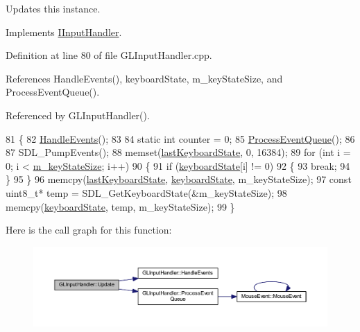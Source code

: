 Updates this instance. 



Implements \hyperlink{class_i_input_handler_af53f50e4542c0e68d7dde659defa960a}{I\+Input\+Handler}.



Definition at line 80 of file G\+L\+Input\+Handler.\+cpp.



References Handle\+Events(), keyboard\+State, m\+\_\+key\+State\+Size, and Process\+Event\+Queue().



Referenced by G\+L\+Input\+Handler().


\begin{DoxyCode}
81 \{
82   \hyperlink{class_g_l_input_handler_a8024ecc15bf5f8a4fa048011eb9e77b1}{HandleEvents}();
83 
84   \textcolor{keyword}{static} \textcolor{keywordtype}{int} counter = 0;
85   \hyperlink{class_g_l_input_handler_a9f03ccbccd3bd3649874f8dfdeeb2271}{ProcessEventQueue}();
86 
87   SDL\_PumpEvents();
88   memset(\hyperlink{class_g_l_input_handler_a578a30a739f18db64d1f6716487165f5}{lastKeyboardState}, 0, 16384);
89   \textcolor{keywordflow}{for} (\textcolor{keywordtype}{int} i = 0; i < \hyperlink{class_g_l_input_handler_afeb05710f1ab21056dd404ba6f41b4b3}{m\_keyStateSize}; i++)
90   \{
91     \textcolor{keywordflow}{if} (\hyperlink{class_g_l_input_handler_a0939fc9cb14210cebfb2b5f57717cef9}{keyboardState}[i] != 0)
92     \{
93       \textcolor{keywordflow}{break};
94     \}
95   \}
96   memcpy(\hyperlink{class_g_l_input_handler_a578a30a739f18db64d1f6716487165f5}{lastKeyboardState}, \hyperlink{class_g_l_input_handler_a0939fc9cb14210cebfb2b5f57717cef9}{keyboardState}, m\_keyStateSize);
97   \textcolor{keyword}{const} uint8\_t* temp = SDL\_GetKeyboardState(&m\_keyStateSize);
98   memcpy(\hyperlink{class_g_l_input_handler_a0939fc9cb14210cebfb2b5f57717cef9}{keyboardState}, temp, m\_keyStateSize);
99 \}
\end{DoxyCode}


Here is the call graph for this function\+:\nopagebreak
\begin{figure}[H]
\begin{center}
\leavevmode
\includegraphics[width=350pt]{class_g_l_input_handler_ab0d7e33520356b9de4298e941c3155f6_cgraph}
\end{center}
\end{figure}




